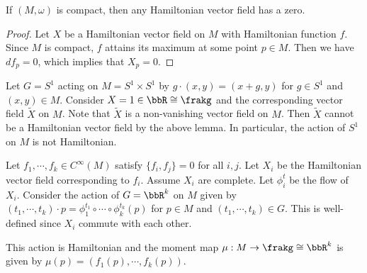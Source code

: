   \begin{lemma}
    If $(M,\omega)$ is compact, then any Hamiltonian vector field has a zero.
  \end{lemma}
  \begin{proof}
    Let $X$ be a Hamiltonian vector field on $M$ with Hamiltonian function $f$.
    Since $M$ is compact, $f$ attains its maximum at some point $p \in M$.
    Then we have $df_p = 0$, which implies that $X_p = 0$.
  \end{proof}

  \begin{example}
    Let $G = S^1$ acting on $M = S^1 \times S^1$ by $g \cdot (x,y) = (x + g, y)$ for $g \in S^1$ and $(x,y) \in M$.
    Consider $X = 1 \in \bbR \cong \frakg$ and the corresponding vector field $\tilde{X}$ on $M$.
    Note that $\tilde{X}$ is a non-vanishing vector field on $M$.
    Then $\tilde{X}$ cannot be a Hamiltonian vector field by the above lemma.
    In particular, the action of $S^1$ on $M$ is not Hamiltonian.
  \end{example}

  \begin{example}
    Let $f_1,\cdots,f_k \in C^\infty(M)$ satisfy $\{f_i, f_j\} = 0$ for all $i,j$.
    Let $X_i$ be the Hamiltonian vector field corresponding to $f_i$.
    Assume $X_i$ are complete.
    Let $\phi_i^t$ be the flow of $X_i$.
    Consider the action of $G = \bbR^k$ on $M$ given by $(t_1,\cdots,t_k) \cdot p = \phi_1^{t_1} \circ \cdots \circ \phi_k^{t_k}(p)$ for $p \in M$ and $(t_1,\cdots,t_k) \in G$.
    This is well-defined since $X_i$ commute with each other.

    This action is Hamiltonian and the moment map $\mu: M \to \frakg \cong \bbR^k$ is given by $\mu(p) = (f_1(p),\cdots,f_k(p))$.
  \end{example}
